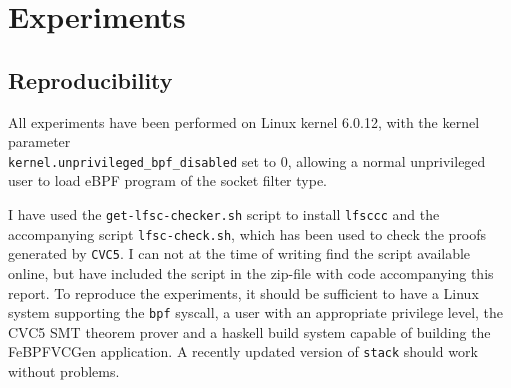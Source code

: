 \section{Experiments}
\label{sec:experiments}
\subsection{Reproducibility}
\label{subsec:reproducibility}


All experiments have been performed on Linux kernel 6.0.12, with the kernel parameter \\ \verb!kernel.unprivileged_bpf_disabled! set to 0, allowing a normal unprivileged user to load eBPF program of the socket filter type. 

I have used the \verb!get-lfsc-checker.sh! script to install \texttt{lfsccc} and the accompanying script \verb!lfsc-check.sh!, which has been used to check the proofs generated by \texttt{CVC5}. I can not at the time of writing find the script available online, but have included the script in the zip-file with code accompanying this report.
To reproduce the experiments, it should be sufficient to have a Linux system supporting the \texttt{bpf} syscall, a user with an appropriate privilege level, the CVC5 SMT theorem prover and a haskell build system capable of building the FeBPFVCGen application. A recently updated version of \texttt{stack} should work without problems. 


